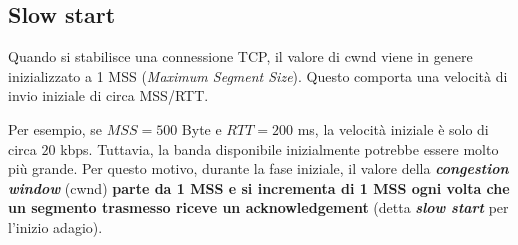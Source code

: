 \documentclass[a4paper]{article}
\begin{document}
	\subsection{Slow start}
	Quando si stabilisce una connessione TCP, il valore di \textsf{cwnd} viene in genere inizializzato a 1 MSS (\emph{Maximum Segment Size}). Questo comporta una velocità di invio iniziale di circa MSS/RTT.\newline
	
	\noindent
	Per esempio, se $MSS = 500$ Byte e $RTT = 200$ ms, la velocità iniziale è solo di circa $20$ kbps. Tuttavia, la banda disponibile inizialmente potrebbe essere molto più grande. Per questo motivo, durante la fase iniziale, il valore della \textbf{\emph{congestion window}} (\textsf{cwnd}) \textbf{parte da 1 MSS e si incrementa di 1 MSS ogni volta che un segmento trasmesso riceve un acknowledgement} (detta \textcolor{Red3}{\textbf{\emph{slow start}}} per l’inizio adagio).\newline
	
\end{document}
